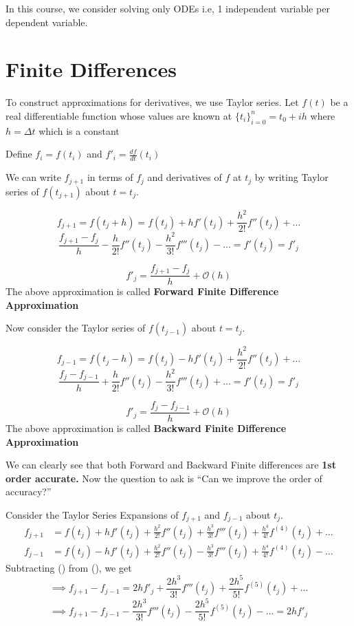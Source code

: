 \documentclass[
]{book}
\begin{document}
In this course, we consider solving only ODEs i.e, 1 independent variable per dependent variable.

\hypertarget{finite-differences}{%
\section{Finite Differences}\label{finite-differences}}

To construct approximations for derivatives, we use Taylor series. Let \(f(t)\) be a real differentiable function whose values are known at \(\{t_i\}_{i=0}^n=t_0+i h\) where \(h = \Delta t\) which is a constant

Define \(f_i = f(t_i)\) and \(f'_i = \frac{df}{dt}(t_i)\)

We can write \(f_{j+1}\) in terms of \(f_j\) and derivatives of \(f\) at \(t_j\) by writing Taylor series of \(f(t_{j+1})\) about \(t=t_j\).

\[f_{j+1} = f(t_j+h)= f(t_j)+hf'(t_j)+\frac{h^2}{2!}f''(t_j)+\dots\]
\[\dfrac{f_{j+1}-f_j}{h}-\frac{h}{2!}f''(t_j)-\frac{h^2}{3!}f'''(t_j)-\dots = f'(t_j) = f'_j\]

\begin{equation}
f'_j = \dfrac{f_{j+1}-f_j}{h} + \mathcal{O}(h)
\end{equation}
The above approximation is called \textbf{Forward Finite Difference Approximation}

Now consider the Taylor series of \(f(t_{j-1})\) about \(t=t_j\).

\[f_{j-1} = f(t_j-h)= f(t_j)-hf'(t_j)+\frac{h^2}{2!}f''(t_j)+\dots\]
\[\dfrac{f_{j}-f_{j-1}}{h}+\frac{h}{2!}f''(t_j)-\frac{h^2}{3!}f'''(t_j)+\dots = f'(t_j) = f'_j\]

\begin{equation}
f'_j = \dfrac{f_{j}-f_{j-1}}{h} + \mathcal{O}(h)
\end{equation}
The above approximation is called \textbf{Backward Finite Difference Approximation}

We can clearly see that both Forward and Backward Finite differences are \textbf{1st order accurate.} Now the question to ask is ``Can we improve the order of accuracy?''

Consider the Taylor Series Expansions of \(f_{j+1}\) and \(f_{j-1}\) about \(t_j\).
\begin{align*}
f_{j+1} &= f(t_j)+hf'(t_j)+\frac{h^2}{2!}f''(t_j)+\frac{h^3}{3!}f'''(t_j)+\frac{h^4}{4!}f^{(4)}(t_j)+\dots\\
f_{j-1} &= f(t_j)-hf'(t_j)+\frac{h^2}{2!}f''(t_j)-\frac{h^3}{3!}f'''(t_j)+\frac{h^4}{4!}f^{(4)}(t_j)-\dots
\end{align*}
Subtracting () from (), we get
\[\implies f_{j+1}-f_{j-1} = 2hf'_j+\frac{2h^3}{3!}f'''(t_j)+\frac{2h^5}{5!}f^{(5)}(t_j)+\dots\]
\[\implies f_{j+1}-f_{j-1}-\frac{2h^3}{3!}f'''(t_j)-\frac{2h^5}{5!}f^{(5)}(t_j)-\dots = 2hf'_j\]
\end{document}

